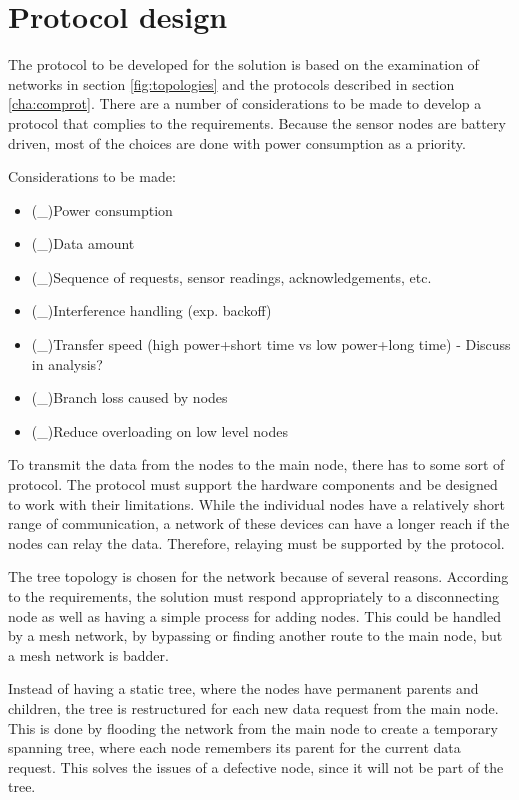 \section{Protocol design}
The protocol to be developed for the solution is based on the examination of networks in section \ref{fig:topologies} and the protocols described in section \ref{cha:comprot}. There are a number of considerations to be made to develop a protocol that complies to the requirements. Because the sensor nodes are battery driven, most of the choices are done with power consumption as a priority.

Considerations to be made:
\begin{itemize}
	\item (\_)Power consumption
	\item (\_)Data amount
	\item (\_)Sequence of requests, sensor readings, acknowledgements, etc.
	\item (\_)Interference handling (exp. backoff)
	\item (\_)Transfer speed (high power+short time vs low power+long time) - Discuss in analysis?
	\item (\_)Branch loss caused by nodes
	\item (\_)Reduce overloading on low level nodes
\end{itemize}

To transmit the data from the nodes to the main node, there has to some sort of protocol. The protocol must support the hardware components and be designed to work with their limitations. While the individual nodes have a relatively short range of communication, a network of these devices can have a longer reach if the nodes can relay the data. Therefore, relaying must be supported by the protocol. 

The tree topology is chosen for the network because of several reasons. 
According to the requirements, the solution must respond appropriately to a disconnecting node as well as having a simple process for adding nodes. 
This could be handled by a mesh network, by bypassing or finding another route to the main node, but a mesh network  is badder. 

Instead of having a static tree, where the nodes have permanent parents and children, the tree is restructured for each new data request from the main node. 
This is done by flooding the network from the main node to create a temporary spanning tree, where each node remembers its parent for the current data request. 
This solves the issues of a defective node, since it will not be part of the tree. 

